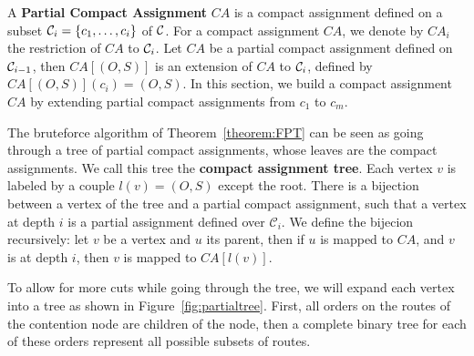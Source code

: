 A \textbf{Partial Compact Assignment} $CA$ is a compact assignment defined on a subset ${\cal C}_i = \{c_1,\ldots,c_i\}$ of ${\cal C}$. For a compact assignment $CA$, we denote by $CA_i$ the restriction of $CA$ to ${\cal C}_i$.
Let $CA$ be a partial compact assignment defined on ${\cal C}_{i-1}$, then $CA[(O,S)]$ is an extension of $CA$ to ${\cal C}_{i}$, defined by $CA[(O,S)](c_i) = (O,S)$.  In this section, we build a compact assignment $CA$ by extending partial compact assignments from $c_1$ to $c_m$.


The bruteforce algorithm of Theorem~\ref{theorem:FPT} can be seen as going through a tree of partial compact assignments,
whose leaves are the compact assignments. We call this tree the \textbf{compact assignment tree}. Each vertex $v$ is labeled by a couple $l(v) = (O,S)$ except the root. There is a bijection between a vertex of the tree and a partial compact assignment, such that a vertex at depth $i$ is a partial assignment defined over $\mathcal{C}_i$.
We define the bijecion recursively: let $v$ be a vertex and $u$ its parent, then if $u$ is mapped to $CA$,
and $v$ is at depth $i$, then $v$ is mapped to $CA[l(v)]$.

To allow for more cuts while going through the tree, we will expand each vertex into a tree as shown in 
Figure~\ref{fig:partialtree}. First, all orders on the routes of the contention node are children of the node, then a complete binary tree for each of these orders represent all possible subsets of routes.

